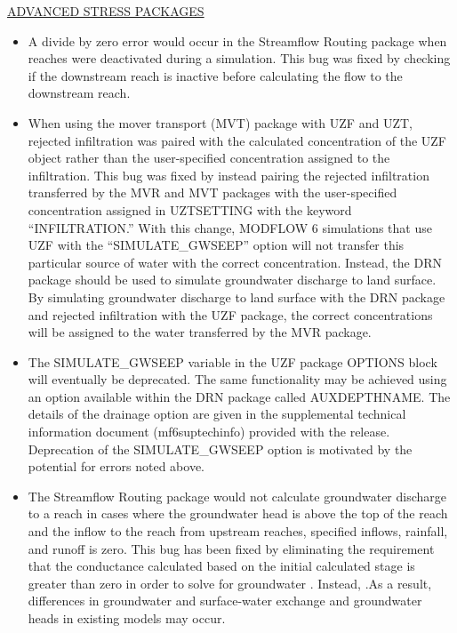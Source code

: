 	\underline{ADVANCED STRESS PACKAGES}
	\begin{itemize}
		\item A divide by zero error would occur in the Streamflow Routing package when reaches were deactivated during a simulation. This bug was fixed by checking if the downstream reach is inactive before calculating the flow to the downstream reach.
		\item When using the mover transport (MVT) package with UZF and UZT, rejected infiltration was paired with the calculated concentration of the UZF object rather than the user-specified concentration assigned to the infiltration.  This bug was fixed by instead pairing the rejected infiltration transferred by the MVR and MVT packages with the user-specified concentration assigned in UZTSETTING with the keyword ``INFILTRATION.''  With this change, MODFLOW 6 simulations that use UZF with the ``SIMULATE\_GWSEEP'' option will not transfer this particular source of water with the correct concentration.  Instead, the DRN package should be used to simulate groundwater discharge to land surface.  By simulating groundwater discharge to land surface with the DRN package and rejected infiltration with the UZF package, the correct concentrations will be assigned to the water transferred by the MVR package.
		\item The SIMULATE\_GWSEEP variable in the UZF package OPTIONS block will eventually be deprecated.  The same functionality may be achieved using an option available within the DRN package called AUXDEPTHNAME.  The details of the drainage option are given in the supplemental technical information document (mf6suptechinfo) provided with the release.  Deprecation of the SIMULATE\_GWSEEP option is motivated by the potential for errors noted above.
		\item The Streamflow Routing package would not calculate groundwater discharge to a reach in cases where the groundwater head is above the top of the reach and the inflow to the reach from upstream reaches, specified inflows, rainfall, and runoff is zero. This bug has been fixed by eliminating the requirement that the conductance calculated based on the initial calculated stage is greater than zero in order to solve for groundwater . Instead, .As a result, differences in groundwater and surface-water exchange and groundwater heads in existing models may occur.  
	\end{itemize}



